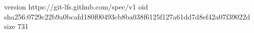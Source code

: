 version https://git-lfs.github.com/spec/v1
oid sha256:0729c22b9a0bcafd180f00493cb8ba038f6125f127a61dd7d8ef42a07f39022d
size 731
